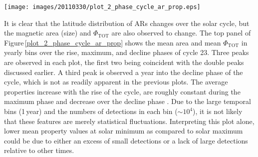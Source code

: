 \documentclass[namedreferences]{solarphysics}
\begin{document}
\begin{article}


\begin{figure*}[!ht]
 
\texttt{[image: images/20110330/plot\_2\_phase\_cycle\_ar\_prop.eps]}
\caption{\emph{Top}: Average magnetic feature area and $\Phi_{\mathrm{TOT}}$ in yearly, 6-month, and 3-month bins (black, dashed gray, and gray lines, respectively). Vertical red lines denote beginning and end of solar cycle phases. Arrows indicate peaks in $\langle$area$\rangle$ and $\langle\Phi\rangle$. \emph{Middle}: Distributions of detection areas for ``rise" (dashed line), ``maximum" (black line), and ``decline" (gray line) phases defined in \emph{top} panel. A power-law fit to the rise-phase distribution is indicated by the solid red line and the bounds of the fit are indicated by the vertical red dashed lines. \emph{Bottom}: Same as \emph{middle} panel, but showing $\Phi_{\mathrm{TOT}}$.}
\label{plot_2_phase_cycle_ar_prop}
\end{figure*}


It is clear that the latitude distribution of ARs changes over the solar cycle, but the magnetic area (size) and $\Phi_{\mathrm{TOT}}$ are also observed to change. The top panel of Figure\,\ref{plot_2_phase_cycle_ar_prop} shows the mean area and mean $\Phi_{\mathrm{TOT}}$ in yearly bins over the rise, maximum, and decline phases of cycle 23. Three peaks are observed in each plot, the first two being coincident with the double peaks discussed earlier. A third peak is observed a year into the decline phase of the cycle, which is not as readily apparent in the previous plots. The average properties increase with the rise of the cycle, are roughly constant during the maximum phase and decrease over the decline phase \citep[agreeing with the findings of][]{tang:1984}. Due to the large temporal bins (1\,year) and the numbers of detections in each bin ($\sim$$10^4$), it is not likely that these features are merely statistical fluctuations. Interpreting this plot alone, lower mean property values at solar minimum as compared to solar maximum could be due to either an excess of small detections or a lack of large detections relative to other times.


\end{article}
\end{document}
